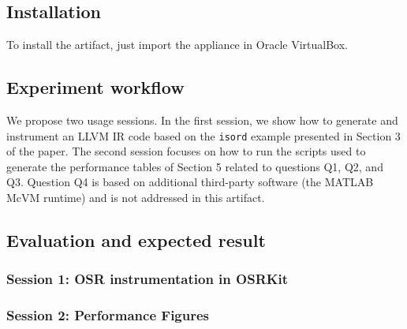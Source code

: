 \documentclass{sigplanconf}
\newcommand{\osrkit}{{\sf OSRKit}}
\begin{document}
\subsection{Installation}

To install the artifact, just import the appliance in Oracle VirtualBox.

\subsection{Experiment workflow}

We propose two usage sessions. In the first session, we show how to generate and instrument an LLVM IR code based on the \texttt{isord} example presented in Section 3 of the paper. The second session focuses on how to run the scripts used to generate the performance tables of Section 5 related to questions Q1, Q2, and Q3. Question Q4 is based on additional third-party software (the MATLAB McVM runtime) and is not addressed in this artifact.

\subsection{Evaluation and expected result}

\subsubsection{Session 1: OSR instrumentation in \osrkit}

\subsubsection{Session 2: Performance Figures}  


\end{document}
